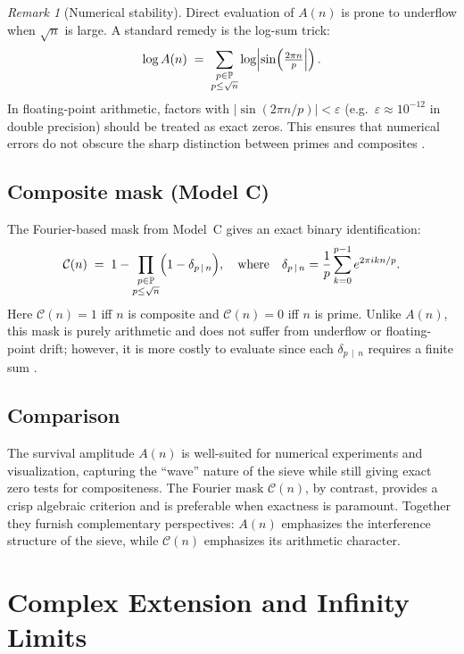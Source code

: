 \documentclass[12pt]{article}
\theoremstyle{definition}
\theoremstyle{remark}
\newtheorem{remark}{Remark}
\newcommand{\Primes}{\mathbb{P}}
\newcommand{\divides}{\,\mid\,}
\begin{document}
\begin{remark}[Numerical stability]
Direct evaluation of $A(n)$ is prone to underflow when $\sqrt{n}$ is large. 
A standard remedy is the log-sum trick:
\[
\log A(n) \;=\; \sum_{\substack{p\in\Primes\\ p\le \sqrt{n}}}
\log \Bigl|\sin\!\left(\tfrac{2\pi n}{p}\Bigr|\right).
\]
In floating-point arithmetic, factors with $|\sin(2\pi n/p)|<\varepsilon$ 
(e.g.\ $\varepsilon \approx 10^{-12}$ in double precision) should be treated as exact zeros. 
This ensures that numerical errors do not obscure the sharp distinction between primes and composites 
\citep{higham2002accuracy,press2007numerical}.
\end{remark}

\subsection{Composite mask (Model C)}

The Fourier-based mask from Model~C gives an exact binary identification:
\[
\mathcal{C}(n) \;=\; 
1 - \prod_{\substack{p\in\Primes\\ p\le \sqrt{n}}}
\Bigl(1 - \delta_{p\divides n}\Bigr),
\quad\text{where}\quad
\delta_{p\divides n}
= \frac{1}{p}\sum_{k=0}^{p-1} e^{2\pi i k n/p}.
\]
Here $\mathcal{C}(n)=1$ iff $n$ is composite and $\mathcal{C}(n)=0$ iff $n$ is prime. 
Unlike $A(n)$, this mask is purely arithmetic and does not suffer from underflow or floating-point drift; 
however, it is more costly to evaluate since each $\delta_{p\divides n}$ requires a finite sum 
\citep{montgomery2006multiplicative,murty2008problems}.

\subsection{Comparison}

The survival amplitude $A(n)$ is well-suited for numerical experiments and visualization, 
capturing the ``wave'' nature of the sieve while still giving exact zero tests for compositeness. 
The Fourier mask $\mathcal{C}(n)$, by contrast, provides a crisp algebraic criterion and is preferable 
when exactness is paramount. 
Together they furnish complementary perspectives: $A(n)$ emphasizes the interference structure of the sieve, 
while $\mathcal{C}(n)$ emphasizes its arithmetic character.

\section{Complex Extension and Infinity Limits}\label{sec:complex}
\end{document}
